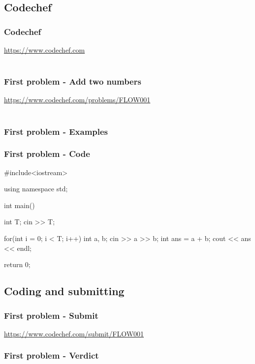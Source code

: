 \subsection{Codechef}
\begin{frame}
    \frametitle{Codechef}
    \href{https://www.codechef.com}{https://www.codechef.com} \\
    \\
\end{frame}
\begin{frame}
    \frametitle{First problem - Add two numbers}
    \href{https://www.codechef.com/problems/FLOW001}{https://www.codechef.com/problems/FLOW001} \\
    \\
\end{frame}
\begin{frame}
    \frametitle{First problem - Examples}
\end{frame}

\begin{frame}[fragile]
\frametitle{First problem - Code}
\begin{cppcode}
#include<iostream>

using namespace std;

int main() {
    int T;
    cin >> T;
    
    for(int i = 0; i < T; i++) {
        int a, b;
        cin >> a >> b;
        int ans = a + b;
        cout << ans << endl;
    }
    	
    return 0;
}
\end{cppcode}
\end{frame}

\subsection{Coding and submitting}

\begin{frame}
    \frametitle{First problem - Submit}
    \href{https://www.codechef.com/submit/FLOW001}{https://www.codechef.com/submit/FLOW001}
\end{frame}

\begin{frame}
    \frametitle{First problem - Verdict}
\end{frame}

